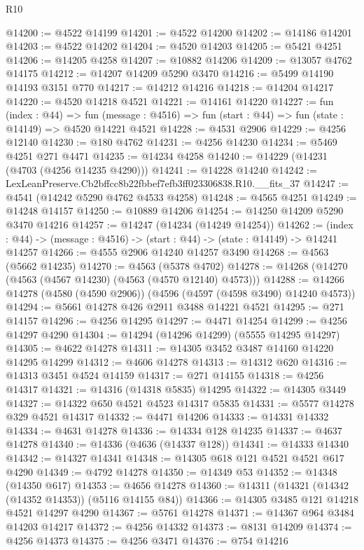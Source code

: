 \begin{lexlean}{R10}
\begin{coremodule}
@14200 := @4522 @14199
@14201 := @4522 @14200
@14202 := @14186 @14201
@14203 := @4522 @14202
@14204 := @4520 @14203
@14205 := @5421 @4251
@14206 := @14205 @4258
@14207 := @10882 @14206
@14209 := @13057 @4762 @14175
@14212 := @14207 @14209 @5290 @3470
@14216 := @5499 @14190 @14193 @3151 @770
@14217 := @14212 @14216
@14218 := @14204 @14217
@14220 := @4520 @14218 @4521
@14221 := @14161 @14220
@14227 := fun (index : @44) =>
  fun (message : @4516) => fun (start : @44) => fun (state : @14149) => @4520 @14221 @4521
@14228 := @4531 @2906
@14229 := @4256 @12140
@14230 := @180 @4762
@14231 := @4256 @14230
@14234 := @5469 @4251 @271 @4471
@14235 := @14234 @4258
@14240 := @14229 (@14231 (@4703 (@4256 @14235 @4290)))
@14241 := @14228 @14240
@14242 := LexLeanPreserve.Cb2bffcc8b22fbbef7efb3ff023306838.R10.__fits_37
@14247 := @4541 (@14242 @5290 @4762 @4533 @4258)
@14248 := @4565 @4251
@14249 := @14248 @14157
@14250 := @10889 @14206
@14254 := @14250 @14209 @5290 @3470 @14216
@14257 := @14247 (@14234 (@14249 @14254))
@14262 := (index : @44) -> (message : @4516) -> (start : @44) -> (state : @14149) -> @14241 @14257
@14266 := @4555 @2906 @14240 @14257 @3490
@14268 := @4563 (@5662 @14235)
@14270 := @4563 (@5378 @4702)
@14278 := @14268 (@14270 (@4563 (@4567 @14230) (@4563 (@4570 @12140) @4573)))
@14288 := @14266 @14278 (@4580 (@4590 @2906)) (@4596 (@4597 (@4598 @3490) @14240 @4573))
@14294 := @5661 @14278 @426 @2911 @3488 @14221 @4521
@14295 := @271 @14157
@14296 := @4256 @14295
@14297 := @4471 @14254
@14299 := @4256 @14297 @4290
@14304 := @14294 (@14296 @14299) (@5555 @14295 @14297)
@14305 := @4622 @14278
@14311 := @14305 @3452 @3487 @14160 @14220 @14295 @14299
@14312 := @4606 @14278
@14313 := @14312 @620
@14316 := @14313 @3451 @4524 @14159
@14317 := @271 @14155
@14318 := @4256 @14317
@14321 := @14316 (@14318 @5835) @14295
@14322 := @14305 @3449
@14327 := @14322 @650 @4521 @4523 @14317 @5835
@14331 := @5577 @14278 @329 @4521 @14317
@14332 := @4471 @14206
@14333 := @14331 @14332
@14334 := @4631 @14278
@14336 := @14334 @128 @14235
@14337 := @4637 @14278
@14340 := @14336 (@4636 (@14337 @128))
@14341 := @14333 @14340
@14342 := @14327 @14341
@14348 := @14305 @618 @121 @4521 @4521 @617 @4290
@14349 := @4792 @14278
@14350 := @14349 @53
@14352 := @14348 (@14350 @617)
@14353 := @4656 @14278
@14360 := @14311 (@14321 (@14342 (@14352 @14353)) (@5116 @14155 @84))
@14366 := @14305 @3485 @121 @14218 @4521 @14297 @4290
@14367 := @5761 @14278
@14371 := @14367 @964 @3484 @14203 @14217
@14372 := @4256 @14332
@14373 := @8131 @14209
@14374 := @4256 @14373
@14375 := @4256 @3471
@14376 := @754 @14216

\end{coremodule}
\end{lexlean}
